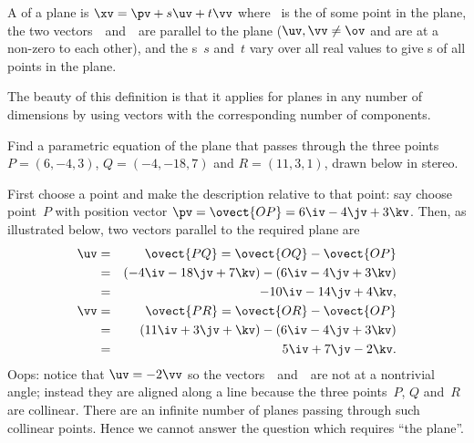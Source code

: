 \begin{definition} \label{def:parpla}
A  of a plane is \(\xv=\pv+s\uv+t\vv\) where \pv~is the  of some point in the plane,   the two vectors~\uv\ and~\vv\ are parallel to the plane (\(\uv,\vv\neq\ov\) and are at a non-zero  to each other), and the  s~\(s\) and~\(t\) vary over all real values to give s of all points in the plane.
\end{definition}

The beauty of this definition is that it applies for planes in any number of dimensions by using vectors with the corresponding number of components.



\begin{example} \label{eg:}
Find a parametric equation of the plane that passes through the three points \(P=(6,-4,3)\), \(Q=(-4,-18,7)\) and \(R=(11,3,1)\), drawn below in stereo.
\begin{center}
 {}
\end{center}

\begin{solution} 
First choose a point and make the description relative to that point: say choose point~\(P\) with position vector \(\pv=\ovect{OP}=6\iv-4\jv+3\kv\).
Then, as illustrated below, two vectors parallel to the required plane are 
\begin{eqnarray*}
\uv&=&\ovect{PQ} =\ovect{OQ}-\ovect{OP} 
\\&=&(-4\iv-18\jv+7\kv)-(6\iv-4\jv+3\kv) 
\\&=&-10\iv-14\jv+4\kv,
\\\vv&=&\ovect{PR} =\ovect{OR}-\ovect{OP} 
\\&=&(11\iv+3\jv+\kv)-(6\iv-4\jv+3\kv) 
\\&=&5\iv+7\jv-2\kv.
\end{eqnarray*}
Oops: notice that \(\uv=-2\vv\) so the vectors~\uv\ and~\vv\ are not at a nontrivial angle; instead they are aligned along a line because the three points~\(P\), \(Q\) and~\(R\) are collinear.
There are an infinite number of planes passing through such collinear  points.
Hence we cannot answer the question which requires ``the plane''.
\end{solution}
\end{example}




